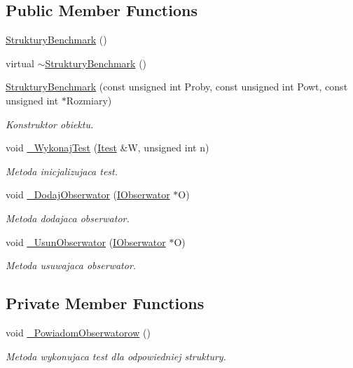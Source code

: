 \subsection*{Public Member Functions}
\begin{DoxyCompactItemize}
\item 
\hyperlink{class_struktury_benchmark_a76f71aa0d0ae63409b37cc021a81f2ed}{Struktury\-Benchmark} ()
\item 
virtual \hyperlink{class_struktury_benchmark_a0bb33b43ae5218a09aadf90594d27e75}{$\sim$\-Struktury\-Benchmark} ()
\item 
\hyperlink{class_struktury_benchmark_a044ec90659469fc79e43593d3f6dc442}{Struktury\-Benchmark} (const unsigned int Proby, const unsigned int Powt, const unsigned int $\ast$Rozmiary)
\begin{DoxyCompactList}\small\item\em Konstruktor obiektu. \end{DoxyCompactList}\item 
void \hyperlink{class_struktury_benchmark_a523fc1ac9a7a80dc7182d1a8edf845ec}{\-\_\-\-Wykonaj\-Test} (\hyperlink{class_itest}{Itest} \&W, unsigned int n)
\begin{DoxyCompactList}\small\item\em Metoda inicjalizujaca test. \end{DoxyCompactList}\item 
void \hyperlink{class_struktury_benchmark_a63247cc5616565e429f5abd09d887630}{\-\_\-\-Dodaj\-Obserwator} (\hyperlink{class_i_obserwator}{I\-Obserwator} $\ast$O)
\begin{DoxyCompactList}\small\item\em Metoda dodajaca obserwator. \end{DoxyCompactList}\item 
void \hyperlink{class_struktury_benchmark_af08fe671ed7528428ffcb8a4daf65197}{\-\_\-\-Usun\-Obserwator} (\hyperlink{class_i_obserwator}{I\-Obserwator} $\ast$O)
\begin{DoxyCompactList}\small\item\em Metoda usuwajaca obserwator. \end{DoxyCompactList}\end{DoxyCompactItemize}
\subsection*{Private Member Functions}
\begin{DoxyCompactItemize}
\item 
void \hyperlink{class_struktury_benchmark_af5aa09efcf9a1727e0868930b97ede49}{\-\_\-\-Powiadom\-Obserwatorow} ()
\begin{DoxyCompactList}\small\item\em Metoda wykonujaca test dla odpowiedniej struktury. \end{DoxyCompactList}\end{DoxyCompactItemize}
